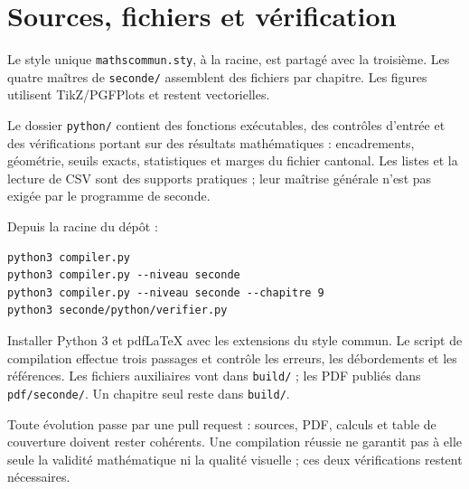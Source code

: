 \documentclass[11pt,a4paper,oneside]{book}
\begin{document}
\chapter{Sources, fichiers et vérification}
Le style unique \texttt{mathscommun.sty}, à la racine, est partagé avec la troisième. Les quatre maîtres de \texttt{seconde/} assemblent des fichiers par chapitre. Les figures utilisent TikZ/PGFPlots et restent vectorielles.

Le dossier \texttt{python/} contient des fonctions exécutables, des contrôles d'entrée et des vérifications portant sur des résultats mathématiques : encadrements, géométrie, seuils exacts, statistiques et marges du fichier cantonal. Les listes et la lecture de CSV sont des supports pratiques ; leur maîtrise générale n'est pas exigée par le programme de seconde.

Depuis la racine du dépôt :
\begin{lstlisting}
python3 compiler.py
python3 compiler.py --niveau seconde
python3 compiler.py --niveau seconde --chapitre 9
python3 seconde/python/verifier.py
\end{lstlisting}
Installer Python 3 et pdfLaTeX avec les extensions du style commun. Le script de compilation effectue trois passages et contrôle les erreurs, les débordements et les références. Les fichiers auxiliaires vont dans \texttt{build/} ; les PDF publiés dans \texttt{pdf/seconde/}. Un chapitre seul reste dans \texttt{build/}.

Toute évolution passe par une pull request : sources, PDF, calculs et table de couverture doivent rester cohérents. Une compilation réussie ne garantit pas à elle seule la validité mathématique ni la qualité visuelle ; ces deux vérifications restent nécessaires.
\end{document}
